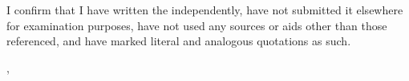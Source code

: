 \thispagestyle{empty}
\vspace*{0.75\textheight}
\noindent

I confirm that I have written the \MakeLowercase{\getDoctype{}} independently, have not submitted it elsewhere for examination purposes, have not used any sources or aids other than those referenced, and have marked literal and analogous quotations as such.

\vspace{15mm}
\noindent
\getSubmissionLocation{}, \getSubmissionDate{} \hspace{50mm} \getAuthor{}

\cleardoublepage{}
